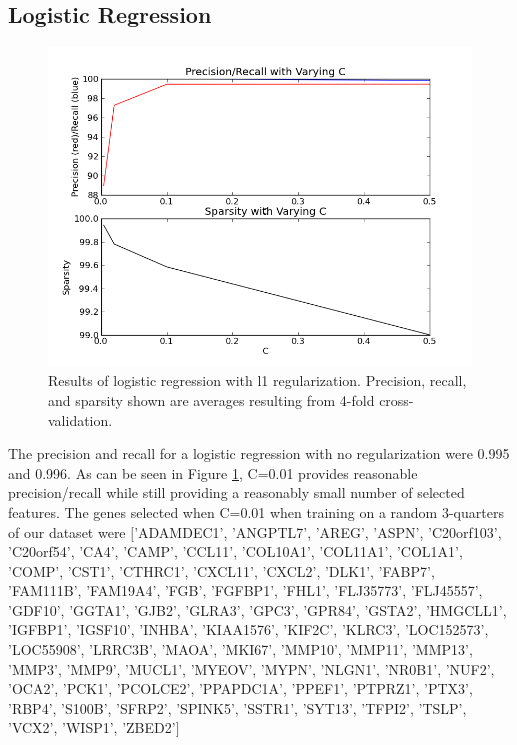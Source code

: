 \documentclass[10.75pt]{article}
\begin{document}
\subsection{Logistic Regression}

\begin{figure}[h]
  \centering
    \includegraphics[scale=0.3]{sparselog.png}
  \caption{Results of logistic regression with l1 regularization. Precision, recall, and sparsity shown are averages resulting from 4-fold cross-validation.}
\label{fig:sparselog}
\end{figure}

The precision and recall for a logistic regression with no regularization were 0.995 and 0.996. As can be seen in Figure \ref{fig:sparselog}, C=0.01 provides reasonable precision/recall while still providing a reasonably small number of selected features. The genes selected when C=0.01 when training on a random 3-quarters of our dataset were $[$'ADAMDEC1', 'ANGPTL7', 'AREG', 'ASPN', 'C20orf103', 'C20orf54', 'CA4', 'CAMP', 'CCL11', 'COL10A1', 'COL11A1', 'COL1A1', 'COMP', 'CST1', 'CTHRC1', 'CXCL11', 'CXCL2', 'DLK1', 'FABP7', 'FAM111B', 'FAM19A4', 'FGB', 'FGFBP1', 'FHL1', 'FLJ35773', 'FLJ45557', 'GDF10', 'GGTA1', 'GJB2', 'GLRA3', 'GPC3', 'GPR84', 'GSTA2', 'HMGCLL1', 'IGFBP1', 'IGSF10', 'INHBA', 'KIAA1576', 'KIF2C', 'KLRC3', 'LOC152573', 'LOC55908', 'LRRC3B', 'MAOA', 'MKI67', 'MMP10', 'MMP11', 'MMP13', 'MMP3', 'MMP9', 'MUCL1', 'MYEOV', 'MYPN', 'NLGN1', 'NR0B1', 'NUF2', 'OCA2', 'PCK1', 'PCOLCE2', 'PPAPDC1A', 'PPEF1', 'PTPRZ1', 'PTX3', 'RBP4', 'S100B', 'SFRP2', 'SPINK5', 'SSTR1', 'SYT13', 'TFPI2', 'TSLP', 'VCX2', 'WISP1', 'ZBED2'$]$
\end{document}
